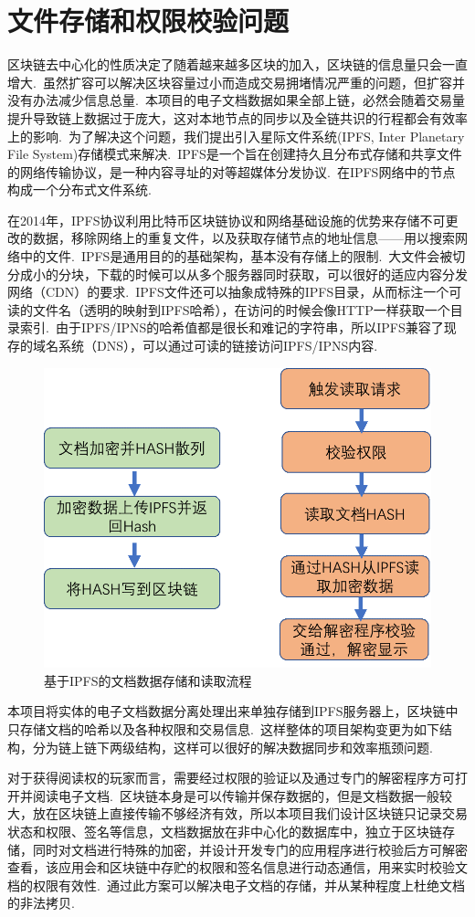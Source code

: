\documentclass[a4paper,12pt,titlepage]{ctexart}
\begin{document}
\section{文件存储和权限校验问题}
区块链去中心化的性质决定了随着越来越多区块的加入，区块链的信息量只会一直增大.~虽然扩容可以解决区块容量过小而造成交易拥堵情况严重的问题，但扩容并没有办法减少信息总量.~本项目的电子文档数据如果全部上链，必然会随着交易量提升导致链上数据过于庞大，这对本地节点的同步以及全链共识的行程都会有效率上的影响.~为了解决这个问题，我们提出引入星际文件系统(IPFS, Inter Planetary File System)存储模式来解决.~IPFS是一个旨在创建持久且分布式存储和共享文件的网络传输协议，是一种内容寻址的对等超媒体分发协议.~在IPFS网络中的节点构成一个分布式文件系统.~\par
在2014年，IPFS协议利用比特币区块链协议和网络基础设施的优势来存储不可更改的数据，移除网络上的重复文件，以及获取存储节点的地址信息——用以搜索网络中的文件.~IPFS是通用目的的基础架构，基本没有存储上的限制.~大文件会被切分成小的分块，下载的时候可以从多个服务器同时获取，可以很好的适应内容分发网络（CDN）的要求.~IPFS文件还可以抽象成特殊的IPFS目录，从而标注一个可读的文件名（透明的映射到IPFS哈希），在访问的时候会像HTTP一样获取一个目录索引.~由于IPFS/IPNS的哈希值都是很长和难记的字符串，所以IPFS兼容了现存的域名系统（DNS），可以通过可读的链接访问IPFS/IPNS内容.~\par
\begin{figure}[!hbp]
	\centering
	\includegraphics[scale=0.5]{fig23.png}
	\caption{基于IPFS的文档数据存储和读取流程}
\end{figure}
本项目将实体的电子文档数据分离处理出来单独存储到IPFS服务器上，区块链中只存储文档的哈希以及各种权限和交易信息.~这样整体的项目架构变更为如下结构，分为链上链下两级结构，这样可以很好的解决数据同步和效率瓶颈问题.~\par
对于获得阅读权的玩家而言，需要经过权限的验证以及通过专门的解密程序方可打开并阅读电子文档.~区块链本身是可以传输并保存数据的，但是文档数据一般较大，放在区块链上直接传输不够经济有效，所以本项目我们设计区块链只记录交易状态和权限、签名等信息，文档数据放在非中心化的数据库中，独立于区块链存储，同时对文档进行特殊的加密，并设计开发专门的应用程序进行校验后方可解密查看，该应用会和区块链中存贮的权限和签名信息进行动态通信，用来实时校验文档的权限有效性.~通过此方案可以解决电子文档的存储，并从某种程度上杜绝文档的非法拷贝.~
\end{document}
